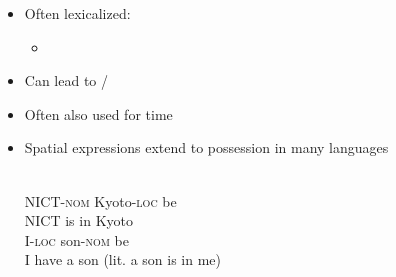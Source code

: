 \documentclass[a4paper,landscape,headrule,footrule,xetex,25pt]{foils}
\begin{document}




\begin{itemize}
\item Often lexicalized:
  \begin{itemize}
  \item {}
  \end{itemize}
\item Can lead to /
  \begin{exe}
    \ex {}
  \end{exe}
\item Often also used for time
  \begin{exe}
    \ex {}
  \end{exe}
\newpage
\item Spatial expressions extend to possession in many languages
  \begin{exe}
    \ex \gll {}   \\
    NICT-\textsc{nom} Kyoto-\textsc{loc} be \\
    \trans NICT is in Kyoto
    \ex \gll {}    \\
     I-\textsc{loc}  son-\textsc{nom} be \\
    \trans I have a son (lit. a son is in me)
   \end{exe}
\end{itemize}

\end{document}

